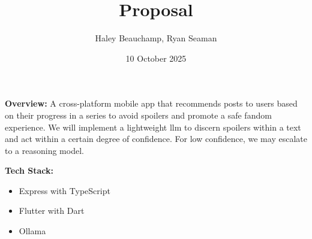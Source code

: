 \documentclass{homework}
\author{Haley Beauchamp, Ryan Seaman}
\date{10 October 2025}
\title{Proposal}
\begin{document}
 \maketitle

\textbf{Overview:} A cross-platform mobile app that recommends posts to users based on their progress in a series to avoid spoilers and promote a safe fandom experience. We will implement a lightweight llm to discern spoilers within a text and act within a certain degree of confidence. For low confidence, we may escalate to a reasoning model.

\bigskip

\textbf{Tech Stack:}
\begin{itemize}
  \item Express with TypeScript
  \item Flutter with Dart
  \item Ollama
\end{itemize}

% 
% 
\end{document}
